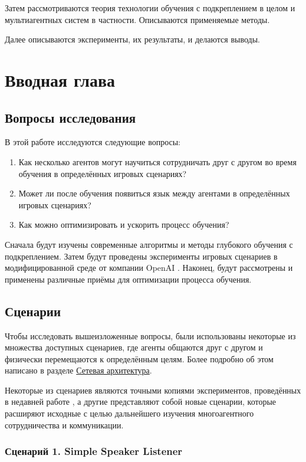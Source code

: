 Затем рассмотриваются теория технологии обучения с подкреплением в целом и мультиагентных систем в частности. Описываются применяемые методы.

Далее описываются эксперименты, их результаты, и делаются выводы.


\chapter{Вводная глава}


\section{Вопросы исследования} \label{intro-questions}

В этой работе исследуются следующие вопросы:
\begin{enumerate}[1.]
    \item Как несколько агентов могут научиться сотрудничать друг с другом во время обучения в определённых игровых сценариях?
    \item Может ли после обучения появиться язык между агентами в определённых игровых сценариях?
    \item Как можно оптимизировать и ускорить процесс обучения?
\end{enumerate}

Сначала будут изучены современные алгоритмы и методы глубокого обучения с подкреплением. Затем будут проведены эксперименты игровых сценариев в модифицированной среде от компании OpenAI \cite{OpenAI-Gym}. Наконец, будут рассмотрены и применены различные приёмы для оптимизации процесса обучения.


\section{Сценарии} \label{intro:sec2}

Чтобы исследовать вышеизложенные вопросы, были использованы некоторые из множества доступных сценариев, где агенты общаются друг с другом и физически перемещаются к определённым целям. Более подробно об этом написано в разделе \hyperref[network-architecture]{Сетевая архитектура}.

Некоторые из сценариев являются точными копиями экспериментов, проведённых в недавней работе \cite{lowe2017multiagent}, а другие представляют собой новые сценарии, которые расширяют исходные с целью дальнейшего изучения многоагентного сотрудничества и коммуникации.

\subsection{Сценарий 1. Simple Speaker Listener} \label{intro:ssl}

